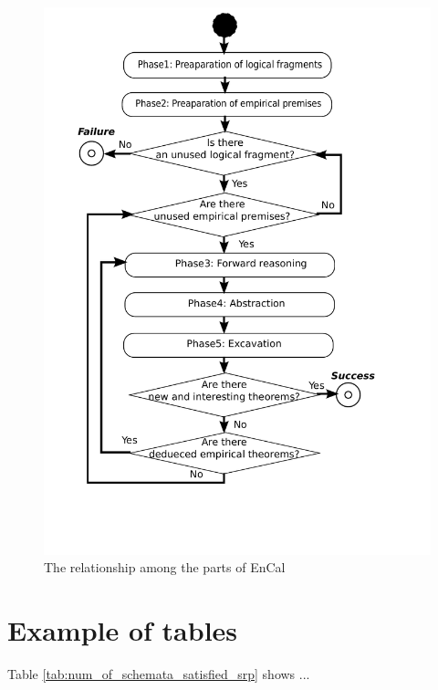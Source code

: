 \documentclass[12pt,dvipdfmx]{report}
\begin{document}
 \begin{figure}[tb]
 \begin{center}
   \includegraphics[scale=0.6]{fig/reasoning_engine.pdf}
  \caption{The relationship among the parts of EnCal}
  \label{fig:reasoning_engine}
 \end{center}
\end{figure}

 \section{Example of tables}

 Table \ref{tab:num_of_schemata_satisfied_srp} shows ...
 
\end{document}

